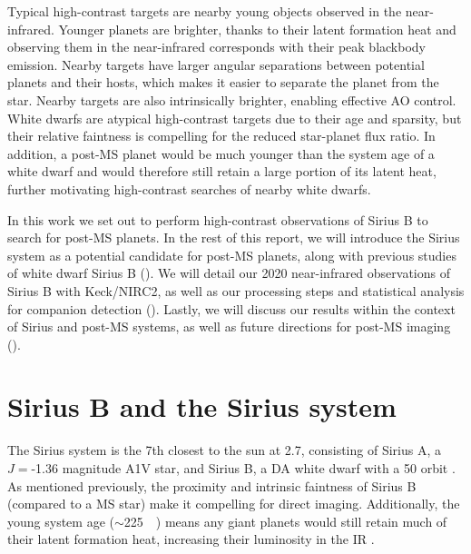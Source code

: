 \documentclass[twocolumn]{aastex631}
\begin{document}
Typical high-contrast targets are nearby young objects observed in the near-infrared. Younger planets are brighter, thanks to their latent formation heat \citep{fortneyGiantPlanetInterior2010} and observing them in the near-infrared corresponds with their peak blackbody emission. Nearby targets have larger angular separations between potential planets and their hosts, which makes it easier to separate the planet from the star. Nearby targets are also intrinsically brighter, enabling effective AO control. White dwarfs are atypical high-contrast targets due to their age and sparsity, but their relative faintness is compelling for the reduced star-planet flux ratio. In addition, a post-MS planet would be much younger than the system age of a white dwarf and would therefore still retain a large portion of its latent heat, further motivating high-contrast searches of nearby white dwarfs.

In this work we set out to perform high-contrast observations of Sirius B to search for post-MS planets. In the rest of this report, we will introduce the Sirius system as a potential candidate for post-MS planets, along with previous studies of white dwarf Sirius B (). We will detail our 2020 near-infrared observations of Sirius B with Keck/NIRC2, as well as our processing steps and statistical analysis for companion detection (). Lastly, we will discuss our results within the context of Sirius and post-MS systems, as well as future directions for post-MS imaging ().

\section{Sirius B and the Sirius system}\label{sec:sirius}

The Sirius system is the 7th closest to the sun at \qty{2.7}{\parsec}, consisting of Sirius A, a $J=$-1.36 magnitude A1V star, and Sirius B, a DA white dwarf with a \qty{50}{\year} orbit \citep{gaiacollaborationGaiaMission2016,bondSiriusSystemIts2017,gaiacollaborationGaiaEarlyData2021}. As mentioned previously, the proximity and intrinsic faintness of Sirius B (compared to a MS star) make it compelling for direct imaging. Additionally, the young system age ($\sim$\qty{225}{\mega\year}) means any giant planets would still retain much of their latent formation heat, increasing their luminosity in the IR \citep{fortneyGiantPlanetInterior2010}.
\end{document}
